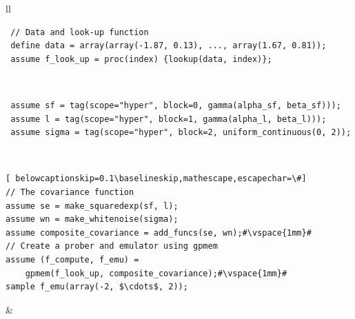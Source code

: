 \begin{tabular}{ll} \hline
{}
  \begin{minipage}{4cm}
 \footnotesize\begin{lstlisting}
 // Data and look-up function
 define data = array(array(-1.87, 0.13), ..., array(1.67, 0.81));
 assume f_look_up = proc(index) {lookup(data, index)};
\end{lstlisting}
\end{minipage}\\
\hline
{}
  \begin{minipage}{4cm}
 \footnotesize\begin{lstlisting}
 assume sf = tag(scope="hyper", block=0, gamma(alpha_sf, beta_sf)));
 assume l = tag(scope="hyper", block=1, gamma(alpha_l, beta_l)));
 assume sigma = tag(scope="hyper", block=2, uniform_continuous(0, 2));
\end{lstlisting}
\end{minipage}
  \\
\hline
\footnotesize\begin{lstlisting}[ belowcaptionskip=0.1\baselineskip,mathescape,escapechar=\#]
// The covariance function
assume se = make_squaredexp(sf, l);
assume wn = make_whitenoise(sigma);
assume composite_covariance = add_funcs(se, wn);#\vspace{1mm}#
// Create a prober and emulator using gpmem
assume (f_compute, f_emu) =
    gpmem(f_look_up, composite_covariance);#\vspace{1mm}#
sample f_emu(array(-2, $\cdots$, 2));
\end{lstlisting}
 &    \\ \hline


\end{tabular}
